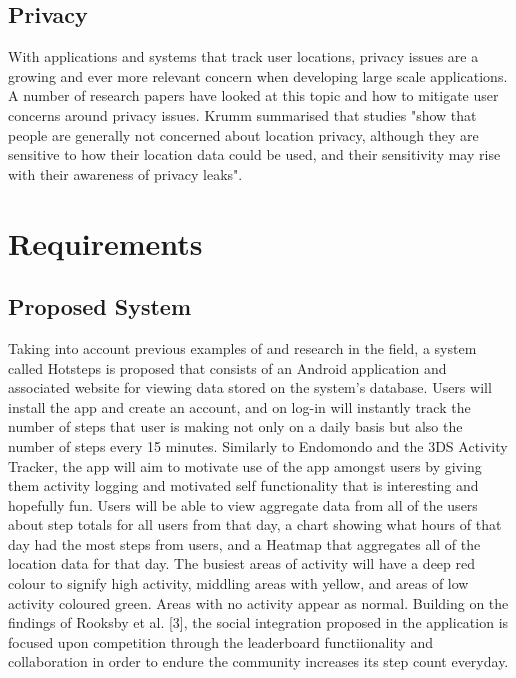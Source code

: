 \documentclass{l4proj}
\begin{document}
\section{Privacy}

With applications and systems that track user locations, privacy issues are a growing and ever more relevant concern when developing large scale applications. A number of research papers have looked at this topic and how to mitigate user concerns around privacy issues. Krumm summarised that studies "show that people are generally not concerned about location privacy, although they are sensitive to how their location data could be used, and their sensitivity may rise with their awareness of privacy leaks".


\chapter{Requirements}

\section{Proposed System}

Taking into account previous examples of and research in the field, a system called Hotsteps is proposed that consists of an Android application and associated website for viewing data stored on the system's database. Users will install the app and create an account, and on log-in will instantly track the number of steps that user is making not only on a daily basis but also the number of steps every 15 minutes. Similarly to Endomondo and the 3DS Activity Tracker, the app will aim to motivate use of the app amongst users by giving them activity logging and motivated self functionality that is interesting and hopefully fun. Users will be able to view aggregate data from all of the users about step totals for all users from that day, a chart showing what hours of that day had the most steps from users, and a Heatmap that aggregates all of the location data for that day. The busiest areas of activity will have a deep red colour to signify high activity, middling areas with yellow, and areas of low activity coloured green. Areas with no activity appear as normal. Building on the findings of Rooksby et al. [3], the social integration proposed in the application is focused upon competition through the leaderboard functiionality and collaboration in order to endure the community increases its step count everyday.
\end{document}

